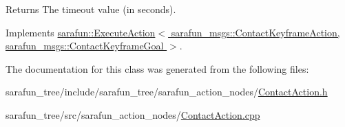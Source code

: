 \begin{DoxyReturn}{Returns}
The timeout value (in seconds). 
\end{DoxyReturn}


Implements \hyperlink{classsarafun_1_1ExecuteAction_aba6cfa8a8ce19e735eb6394424df6d17}{sarafun\-::\-Execute\-Action$<$ sarafun\-\_\-msgs\-::\-Contact\-Keyframe\-Action, sarafun\-\_\-msgs\-::\-Contact\-Keyframe\-Goal $>$}.



The documentation for this class was generated from the following files\-:\begin{DoxyCompactItemize}
\item 
sarafun\-\_\-tree/include/sarafun\-\_\-tree/sarafun\-\_\-action\-\_\-nodes/\hyperlink{ContactAction_8h}{Contact\-Action.\-h}\item 
sarafun\-\_\-tree/src/sarafun\-\_\-action\-\_\-nodes/\hyperlink{ContactAction_8cpp}{Contact\-Action.\-cpp}\end{DoxyCompactItemize}
